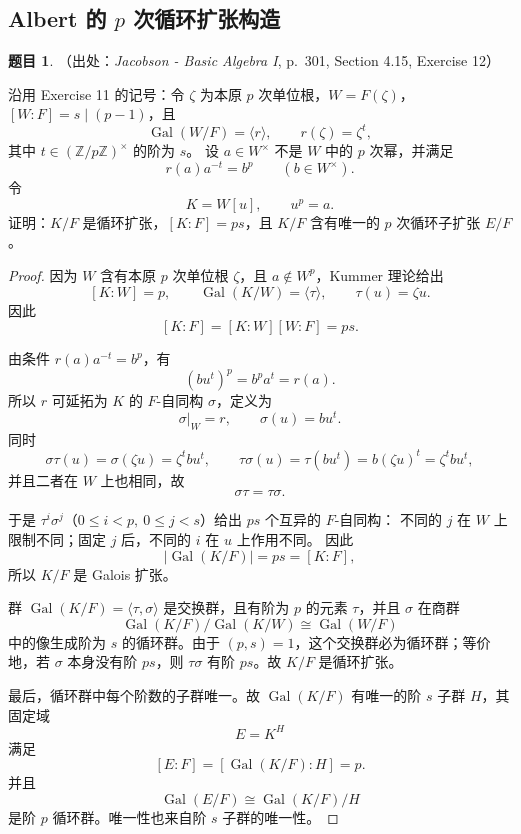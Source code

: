 \documentclass[a4paper]{ctexart}
\theoremstyle{definition}
\newtheorem{example}{题目}[section]
\theoremstyle{analysis}
\theoremstyle{plain}
\begin{document}
\subsection{\texorpdfstring{Albert 的 \(p\) 次循环扩张构造}{Albert 的 p 次循环扩张构造}}\label{subsec:problem-albert-cyclic-degree-p}

\begin{example}
（出处：\textit{Jacobson - Basic Algebra I}, p.~301, Section 4.15, Exercise 12）

沿用 Exercise 11 的记号：令 \(\zeta\) 为本原 \(p\) 次单位根，\(W=F(\zeta)\)，
\([W:F]=s\mid(p-1)\)，且
\[
  \operatorname{Gal}(W/F)=\langle r\rangle,\qquad r(\zeta)=\zeta^t,
\]
其中 \(t\in(\mathbb Z/p\mathbb Z)^\times\) 的阶为 \(s\)。
设 \(a\in W^\times\) 不是 \(W\) 中的 \(p\) 次幂，并满足
\[
  r(a)a^{-t}=b^p\qquad(b\in W^\times).
\]
令
\[
  K=W[u],\qquad u^p=a.
\]
证明：\(K/F\) 是循环扩张，\([K:F]=ps\)，且 \(K/F\) 含有唯一的 \(p\) 次循环子扩张 \(E/F\)。

\begin{proof}
因为 \(W\) 含有本原 \(p\) 次单位根 \(\zeta\)，且 \(a\notin W^p\)，Kummer 理论给出
\[
  [K:W]=p,\qquad
  \operatorname{Gal}(K/W)=\langle\tau\rangle,\qquad \tau(u)=\zeta u.
\]
因此
\[
  [K:F]=[K:W][W:F]=ps.
\]

由条件 \(r(a)a^{-t}=b^p\)，有
\[
  (bu^t)^p=b^p a^t=r(a).
\]
所以 \(r\) 可延拓为 \(K\) 的 \(F\)-自同构 \(\sigma\)，定义为
\[
  \sigma|_W=r,\qquad \sigma(u)=bu^t.
\]
同时
\[
  \sigma\tau(u)=\sigma(\zeta u)=\zeta^tbu^t,
  \qquad
  \tau\sigma(u)=\tau(bu^t)=b(\zeta u)^t=\zeta^tbu^t,
\]
并且二者在 \(W\) 上也相同，故
\[
  \sigma\tau=\tau\sigma.
\]

于是 \(\tau^i\sigma^j\)（\(0\le i<p,\ 0\le j<s\)）给出 \(ps\) 个互异的 \(F\)-自同构：
不同的 \(j\) 在 \(W\) 上限制不同；固定 \(j\) 后，不同的 \(i\) 在 \(u\) 上作用不同。
因此
\[
  |\operatorname{Gal}(K/F)|=ps=[K:F],
\]
所以 \(K/F\) 是 Galois 扩张。

群 \(\operatorname{Gal}(K/F)=\langle\tau,\sigma\rangle\) 是交换群，且有阶为 \(p\) 的元素
\(\tau\)，并且 \(\sigma\) 在商群
\[
  \operatorname{Gal}(K/F)/\operatorname{Gal}(K/W)
  \cong \operatorname{Gal}(W/F)
\]
中的像生成阶为 \(s\) 的循环群。由于 \((p,s)=1\)，这个交换群必为循环群；等价地，若
\(\sigma\) 本身没有阶 \(ps\)，则 \(\tau\sigma\) 有阶 \(ps\)。故 \(K/F\) 是循环扩张。

最后，循环群中每个阶数的子群唯一。故 \(\operatorname{Gal}(K/F)\) 有唯一的阶 \(s\) 子群
\(H\)，其固定域
\[
  E=K^H
\]
满足
\[
  [E:F]=[\operatorname{Gal}(K/F):H]=p.
\]
并且
\[
  \operatorname{Gal}(E/F)\cong \operatorname{Gal}(K/F)/H
\]
是阶 \(p\) 循环群。唯一性也来自阶 \(s\) 子群的唯一性。
\end{proof}
\end{example}
\end{document}
